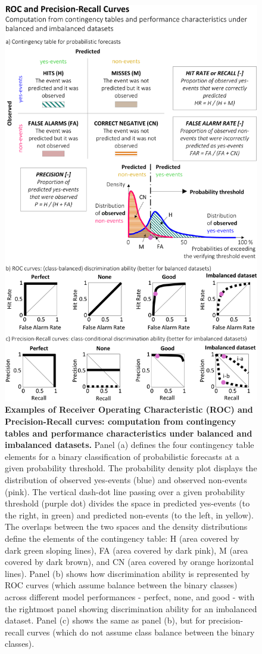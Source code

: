 \begin{figure}[htbp]
\centering
\includegraphics[scale=0.9]{curve_roc_pr_examples.png}
\caption{\textbf{Examples of Receiver Operating Characteristic (ROC) and Precision-Recall curves: computation from contingency tables and performance characteristics under balanced and imbalanced datasets.} Panel (a) defines the four contingency table elements for a binary classification of probabilistic forecasts at a given probability threshold. The probability density plot displays the distribution of observed yes-events (blue) and observed non-events (pink). The vertical dash-dot line passing over a given probability threshold (purple dot) divides the space in predicted yes-events (to the right, in green) and predicted non-events (to the left, in yellow). The overlaps between the two spaces and the density distributions define the elements of the contingency table: H (area covered by dark green sloping lines), FA (area covered by dark pink), M (area covered by dark brown), and CN (area covered by orange horizontal lines). Panel (b) shows how discrimination ability is represented by ROC curves (which assume balance between the binary classes) across different model performances - perfect, none, and good - with the rightmost panel showing discrimination ability for an imbalanced dataset. Panel (c) shows the same as panel (b), but for precision-recall curves (which do not assume class balance between the binary classes).}

\end{figure}
